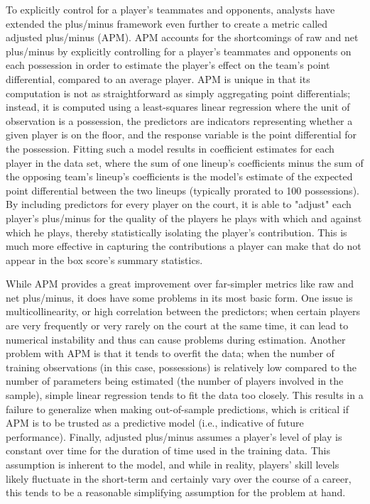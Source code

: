 To explicitly control for a player's teammates and opponents, analysts have
extended the plus/minus framework even further to create a metric called
adjusted plus/minus (APM). APM accounts for the shortcomings of raw and net
plus/minus by explicitly controlling for a player's teammates and opponents on
each possession in order to estimate the player's effect on the team's point
differential, compared to an average player. APM is unique in that its
computation is not as straightforward as simply aggregating point differentials;
instead, it is computed using a least-squares linear regression where the unit
of observation is a possession, the predictors are indicators representing
whether a given player is on the floor, and the response variable is the point
differential for the possession. Fitting such a model results in coefficient
estimates for each player in the data set, where the sum of one lineup's
coefficients minus the sum of the opposing team's lineup's coefficients is the
model's estimate of the expected point differential between the two lineups
(typically prorated to 100 possessions). By including predictors for every
player on the court, it is able to "adjust" each player's plus/minus for the
quality of the players he plays with which and against which he plays, thereby
statistically isolating the player's contribution. This is much more effective
in capturing the contributions a player can make that do not appear in the box
score's summary statistics.

While APM provides a great improvement over far-simpler metrics like raw and net
plus/minus, it does have some problems in its most basic form. One issue is
multicollinearity, or high correlation between the predictors; when certain
players are very frequently or very rarely on the court at the same time, it can
lead to numerical instability and thus can cause problems during estimation.
Another problem with APM is that it tends to overfit the data; when the number
of training observations (in this case, possessions) is relatively low compared
to the number of parameters being estimated (the number of players involved in
the sample), simple linear regression tends to fit the data too closely. This
results in a failure to generalize when making out-of-sample predictions, which
is critical if APM is to be trusted as a predictive model (i.e., indicative of
future performance). Finally, adjusted plus/minus assumes a player's level of
play is constant over time for the duration of time used in the training data.
This assumption is inherent to the model, and while in reality, players' skill
levels likely fluctuate in the short-term and certainly vary over the course
of a career, this tends to be a reasonable simplifying assumption for the
problem at hand.

